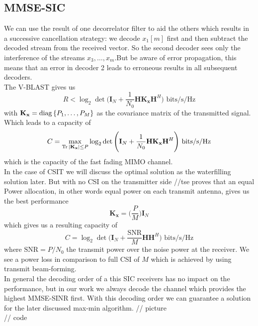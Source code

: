 \subsection{MMSE-SIC}
We can use the result of one decorrelator filter to aid the others which results in a successive cancellation strategy: we decode $x_1[m]$ first and then subtract the decoded stream from the received vector. So the second decoder sees only the interference of the streams $x_3,\dots,x_m$.But be aware of error propagation, this means that an error in decoder 2 leads to erroneous results in all subsequent decoders.\\
The V-BLAST gives us
\begin{equation}
	R<\log_2{\det{\Biggr(\mathbf{I}_N+\frac{1}{N_0}\mathbf{H}\mathbf{K_x}\mathbf{H}^H\Biggl)}} \text{     bits/s/Hz}
\end{equation}
with $\mathbf{K_x} = \mathrm{diag}\left\lbrace P_1,\dots,P_M\right\rbrace$ as the covariance matrix of the transmitted signal. Which leads to a capacity of
\begin{equation}
	C = \max_{\operatorname*{Tr}{|\mathbf{K_x}|}\leq P}{\log_2{\det{\Biggr(\mathbf{I}_N+\frac{1}{N_0}\mathbf{H}\mathbf{K_x}\mathbf{H}^H\Biggl)}}} \text{     bits/s/Hz}
\end{equation}
which is the capacity of the fast fading MIMO channel.\\
In the case of CSIT we will discuss the optimal solution as the waterfilling solution later. But with no CSI on the transmitter side //tse proves that an equal Power allocation, in other words equal power on each transmit antenna, gives us the best performance
\begin{equation}
	\mathbf{K_x} = \Biggr(\frac{P}{M}\Biggl)\mathbf{I}_N
\end{equation}
which gives us a resulting capacity of
\begin{equation}
	C =\log_2{\det{\Biggr(\mathbf{I}_N+\frac{\text{SNR}}{M}\mathbf{HH}^H\Biggl)}} \text{     bits/s/Hz}
\end{equation}
where $\text{SNR} = P/N_0$ the transmit power over the noise power at the receiver.
We see a power loss in comparison to full CSI of $M$ which is achieved by using transmit beam-forming.\\
In general the decoding order of a this SIC receivers has no impact on the performance, but in our work we always decode the channel which provides the highest MMSE-SINR first. With this decoding order we can guarantee a solution for the later discussed max-min algorithm.
// picture\\
// code
